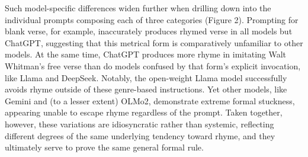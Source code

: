 \documentclass{simple-humanities}         %
\begin{document}
Such model-specific differences widen further when drilling down into the individual prompts composing each of three categories (Figure 2).
Prompting for blank verse, for example, inaccurately produces rhymed verse in all models but ChatGPT, suggesting that this metrical form is comparatively unfamiliar to other models.
At the same time, ChatGPT produces more rhyme in imitating Walt Whitman's free verse than do models confused by that form's explicit invocation, like Llama and DeepSeek.
Notably, the open-weight Llama model successfully avoids rhyme outside of these genre-based instructions.
Yet other models, like Gemini and (to a lesser extent) OLMo2, demonstrate extreme formal stuckness, appearing unable to escape rhyme regardless of the prompt.
Taken together, however, these variations are idiosyncratic rather than systemic, reflecting different degrees of the same underlying tendency toward rhyme, and they ultimately serve to prove the same general formal rule.
\end{document}
